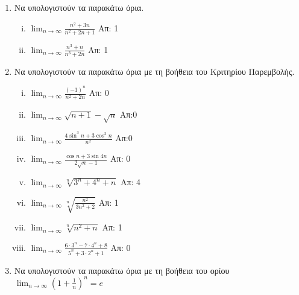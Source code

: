 \begin{enumerate}

    \item Να υπολογιστούν τα παρακάτω όρια.
        \begin{enumerate}[i)]
            \item $ \lim_{n \to \infty} \frac{n^{2}+3n}{n^{2}+2n+1} $ \hfill Απ: 1 
            \item $ \lim_{n \to \infty} \frac{n^{3}+n}{n^{3}+2n} $ \hfill Απ: 1 
        \end{enumerate}

    \item Να υπολογιστούν τα παρακάτω όρια με τη βοήθεια του Κριτηρίου 
        Παρεμβολής.

        \begin{enumerate}[i)]
            \item $ \lim_{n \to \infty} \frac{(-1)^{n}}{n^{2}+2n}  $ \hfill Απ: 0  
            \item $ \lim_{n \to \infty} \sqrt{n+1} - \sqrt{n}  $ \hfill Απ:0
            \item $ \lim_{n \to \infty} \frac{4 \sin^{3}{n} + 3 \cos^{2}{n}}{n^{2}} $ 
                \hfill Απ:0
            \item $ \lim_{n \to \infty} \frac{\cos{n} + 3 \sin{4n}}{ 2
                \sqrt{n} -1} $ \hfill Απ: 0  
            \item $ \lim_{n \to \infty} \sqrt[n]{3^{n}+4^{n}+n} $ \hfill Απ: 4 
            \item $ \lim_{n \to \infty} \sqrt[n]{\frac{n^{2}}{3n^{2}+2}} $ \hfill Απ: 1 
            \item $ \lim_{n \to \infty} \sqrt[n]{n^{2}+n} $ \hfill Απ: 1 
            \item $ \lim_{n \to \infty} \frac{6\cdot 3^{n}-7 \cdot 4^{n}+8}
                {5^{n}+3\cdot 2^{n}+1} $ \hfill Απ: 0  
        \end{enumerate}

    \item Να υπολογιστούν τα παρακάτω όρια με τη βοήθεια του ορίου 
        $ \lim_{n \to \infty} \left(1+ \frac{1}{n}\right)^{n}=e $


\end{enumerate}
